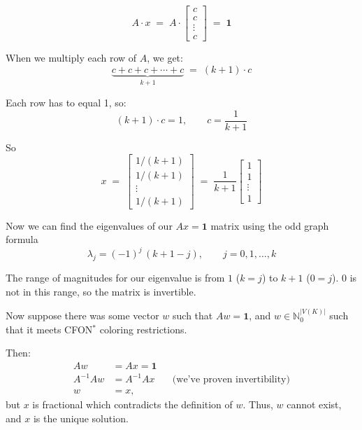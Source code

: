 \documentclass[11pt]{article}
\begin{document}
\[
  A \cdot x \;=\; A \cdot
  \begin{bmatrix} c \\ c \\ \vdots \\ c \end{bmatrix}
  \;=\; \mathbf{1}
\]

When we multiply each row of $A$, we get:
\[
  \underbrace{c + c + c + \cdots + c}_{k+1} \;=\; (k+1) \cdot c
\]

Each row has to equal 1, so:
\[
  (k+1) \cdot c = 1, \qquad c = \frac{1}{k+1}
\]

So
\[
  x \;=\;
  \begin{bmatrix} 1/(k+1) \\ 1/(k+1) \\ \vdots \\ 1/(k+1) \end{bmatrix}
  \;=\; \frac{1}{k+1}
  \begin{bmatrix} 1 \\ 1 \\ \vdots \\ 1 \end{bmatrix}
\]

Now we can find the eigenvalues of our $Ax = \mathbf{1}$ matrix using the odd
graph formula
\[
  \lambda_j = (-1)^j\,(k+1-j), \qquad j = 0, 1, \dots, k
\]

The range of magnitudes for our eigenvalue is from $1$ ($k = j$) to $k+1$
($0 = j$). $0$ is not in this range, so the matrix is invertible.

Now suppose there was some vector $w$ such that $Aw = \mathbf{1}$, and
$w \in \mathbb{N}_0^{|V(K)|}$ such that it meets CFON$^{*}$ coloring
restrictions.

Then:
\begin{align*}
  Aw &= Ax = \mathbf{1} \\
  A^{-1}Aw &= A^{-1}Ax && \text{(we've proven invertibility)} \\
  w &= x,
\end{align*}
but $x$ is fractional which contradicts the definition of $w$. Thus, $w$
cannot exist, and $x$ is the unique solution.
\end{document}
